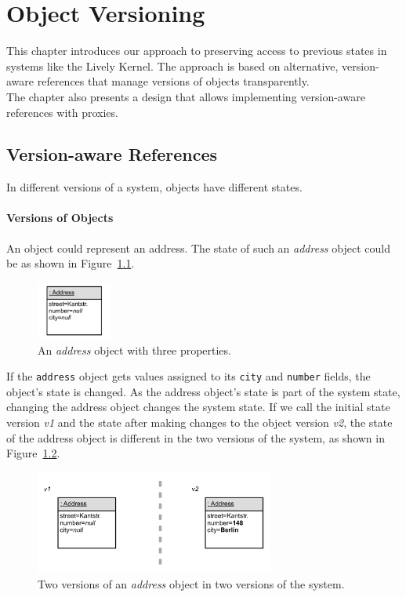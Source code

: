 \chapter{Object Versioning} \label{chapter:APPROACH}

This chapter introduces our approach to preserving access to previous states in systems like the Lively Kernel.
The approach is based on alternative, version-aware references that manage versions of objects transparently.\\
The chapter also presents a design that allows implementing version-aware references with proxies.


\section{Version-aware References} \label{sec:APPROACH:1}

In different versions of a system, objects have different states. 

\subsubsection{Versions of Objects}

An object could represent an address.
The state of such an \emph{address} object could be as shown in Figure~\ref{fig:SingleObject}.

\begin{figure}[h]
    \centering
    \includegraphics[width=0.22\textwidth]{figures/4_approach/1_singleObject.pdf}
    \caption{An \emph{address} object with three properties.}
    \label{fig:SingleObject}
\end{figure}

If the \lstinline{address} object gets values assigned to its \lstinline{city} and \lstinline{number} fields, the object's state is changed.
As the address object's state is part of the system state, changing the address object changes the system state.
If we call the initial state version \emph{v1} and the state after making changes to the object version \emph{v2}, the state of the address object is different in the two versions of the system, as shown in Figure~\ref{fig:ObjectChanged}.

\begin{figure}[h]
    \centering
    \includegraphics[width=0.7\textwidth]{figures/4_approach/2_objectChange.pdf}
    \caption{Two versions of an \emph{address} object in two versions of the system.}
    \label{fig:ObjectChanged}
\end{figure}

